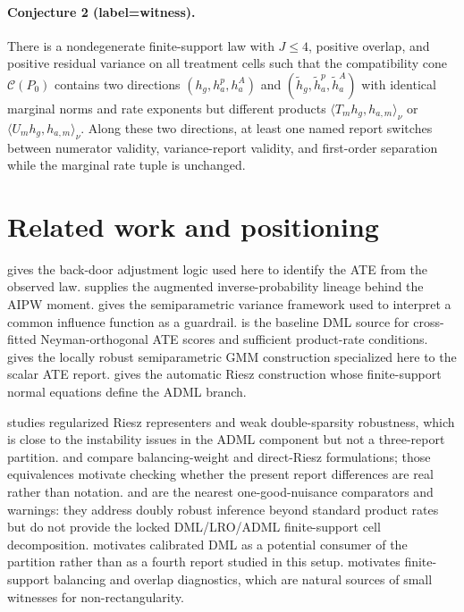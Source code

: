 \documentclass[11pt]{article}
\theoremstyle{definition}
\theoremstyle{plain}
\theoremstyle{remark}
\begin{document}
\paragraph{Conjecture 2 (label=witness).}
There is a nondegenerate finite-support law with \(J\le4\), positive overlap, and positive residual variance on all treatment cells such that the compatibility cone \(\mathcal C(P_0)\) contains two directions \((h_g,h^p_a,h^A_a)\) and \((\tilde h_g,\tilde h^p_a,\tilde h^A_a)\) with identical marginal norms and rate exponents but different products \(\langle T_mh_g,h_{a,m}\rangle_\nu\) or \(\langle U_mh_g,h_{a,m}\rangle_\nu\).  Along these two directions, at least one named report switches between numerator validity, variance-report validity, and first-order separation while the marginal rate tuple is unchanged.

\section{Related work and positioning}
\cite{Pearl1995} gives the back-door adjustment logic used here to identify the ATE from the observed law.  \cite{RobinsRotnitzkyZhao1994JASA} supplies the augmented inverse-probability lineage behind the AIPW moment.  \cite{Newey1994Econometrica} gives the semiparametric variance framework used to interpret a common influence function as a guardrail.  \cite{ChernozhukovEtAl2018ECTJ} is the baseline DML source for cross-fitted Neyman-orthogonal ATE scores and sufficient product-rate conditions.  \cite{ChernozhukovEscancianoIchimuraNeweyRobins2022LRO} gives the locally robust semiparametric GMM construction specialized here to the scalar ATE report.  \cite{ChernozhukovNeweySingh2022ADML} gives the automatic Riesz construction whose finite-support normal equations define the ADML branch.

\cite{ChernozhukovNeweySingh2022RR} studies regularized Riesz representers and weak double-sparsity robustness, which is close to the instability issues in the ADML component but not a three-report partition.  \cite{BrunsSmithDukesFellerOgburn2024ABW} and \cite{BrunsSmith2026RieszApproaches} compare balancing-weight and direct-Riesz formulations; those equivalences motivate checking whether the present report differences are real rather than notation.  \cite{BonviniKennedyDukesBalakrishnan2024} and \cite{DukesVansteelandtWhitney2024JMLR} are the nearest one-good-nuisance comparators and warnings: they address doubly robust inference beyond standard product rates but do not provide the locked DML/LRO/ADML finite-support cell decomposition.  \cite{VanDerLaanLuedtkeCarone2024CDML} motivates calibrated DML as a potential consumer of the partition rather than as a fourth report studied in this setup.  \cite{AtheyImbensWager2018JRSSB} motivates finite-support balancing and overlap diagnostics, which are natural sources of small witnesses for non-rectangularity.
\end{document}
